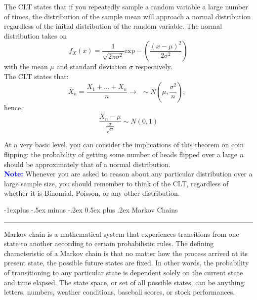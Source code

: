 \documentclass[letterpaper, 10.5pt,landscape]{article}
\makeatletter
\renewcommand{\subsection}{\@startsection{subsection}{2}{0mm}%
                                {-1explus -.5ex minus -.2ex}%
                                {0.5ex plus .2ex}%
                                {\normalfont\normalsize\bfseries}}
\makeatother
\begin{document}
\begin{multicols*}{3}
The CLT states that if you repeatedly sample a random variable a large number of times, the distribution of the sample mean will approach a normal distribution regardless of the initial distribution of the random variable. The normal distribution takes on 
\vspace{-3pt}
\[\boxed{f_{X}(x) = \frac{1}{\sqrt{2\pi\sigma^{2} }} \text{exp}-\left(\frac{(x-\mu)^{2}}{2\sigma^{2}} \right)}\] 
\vspace{-3pt}
with the mean $\mu$ and standard deviation $\sigma$ respectively. \\


\vspace{5pt}
The CLT states that: 
\vspace{-3pt}
\[\boxed{\bar{X}_{n} = \frac{X_{1} + \ldots + X_{n}} {n} \rightarrow \hspace{5pt} \sim N\left(\mu, \frac{\sigma^{2}}{n} \right) ; \hspace{5pt}}\]  
\vspace{-5pt}
hence,
\vspace{-5pt}
\[\boxed{\frac{\bar{X}_{n} - \mu}{\frac{\sigma}{\sqrt{n}}} \sim N(0,1)}\]

At a very basic level, you can consider the implications of this theorem on coin flipping: the probability of getting some number of heads flipped over a large $n$ should be approximately that of a normal distribution. \\

\textbf{\textcolor{blue}{Note:}} Whenever you are asked to reason about any particular distribution over a large sample size, you should remember to think of the CLT, regardless of whether it is Binomial, Poisson, or any other distribution.



\subsection{Markov Chains} {\color{teal}\hrule height 0.5pt} \smallskip
 Markov chain is a mathematical system that experiences transitions from one state to another according to certain probabilistic rules. The defining characteristic of a Markov chain is that no matter how the process arrived at its present state, the possible future states are fixed. In other words, the probability of transitioning to any particular state is dependent solely on the current state and time elapsed. The state space, or set of all possible states, can be anything: letters, numbers, weather conditions, baseball scores, or stock performances.



\end{multicols*}
\end{document}
